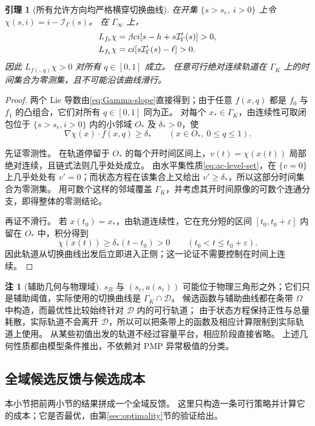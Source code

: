 \documentclass[11pt,a4paper,UTF8]{ctexart}
\newtheorem{lemma}[theorem]{引理}
\theoremstyle{definition}
\newtheorem{remark}[theorem]{注}
\newcommand{\Dcal}{\mathcal D}
\begin{document}
\begin{lemma}[所有允许方向均严格横穿切换曲线]
\label{lem:strict-crossing}
在开集 $\{s>s_e,\ i>0\}$ 上令 $\chi(s,i)=i-\mathcal I_\Gamma(s)$。
在 $\Gamma_\infty$ 上，
\begin{align}
L_{f_0}\chi&=\beta ci[s-h+s\mathcal I_\Gamma'(s)]>0,\notag\\
L_{f_1}\chi&=ci[s\mathcal I_\Gamma'(s)-\ell]>0.\label{eq:strict-crossing}
\end{align}
因此 $L_{f(\cdot,q)}\chi>0$ 对所有 $q\in[0,1]$ 成立。
任意可行绝对连续轨道在 $\Gamma_K$ 上的时间集合为零测集，且不可能沿该曲线滑行。
\end{lemma}
\begin{proof}
两个 Lie 导数由\eqref{eq:Gamma-slope}直接得到；由于任意 $f(x,q)$ 都是 $f_0$ 与 $f_1$ 的凸组合，它们对所有 $q\in[0,1]$ 同为正。
对每个 $x_*\in\Gamma_K$，由连续性可取闭包位于 $\{s>s_e,i>0\}$ 内的小邻域 $O_*$ 及 $\delta_*>0$，使
\[
\nabla\chi(x)\cdot f(x,q)\ge\delta_*\qquad(x\in O_*,\ 0\le q\le1).
\]

先证零测性。
在轨道停留于 $O_*$ 的每个开时间区间上，$v(t)=\chi(x(t))$ 局部绝对连续，且链式法则几乎处处成立。
由水平集性质\eqref{eq:ac-level-set}，在 $\{v=0\}$ 上几乎处处有 $v'=0$；而状态方程在该集合上又给出 $v'\ge\delta_*$，所以这部分时间集合为零测集。
用可数个这样的邻域覆盖 $\Gamma_K$，并考虑其开时间原像的可数个连通分支，即得整体的零测结论。

再证不滑行。
若 $x(t_0)=x_*$，由轨道连续性，它在充分短的区间 $[t_0,t_0+\varepsilon]$ 内留在 $O_*$ 中，积分得到
\begin{equation}
\chi(x(t))\ge\delta_*(t-t_0)>0\qquad(t_0<t\le t_0+\varepsilon).
\label{eq:strict-crossing-time}
\end{equation}
因此轨道从切换曲线出发后立即进入正侧；这一论证不需要控制在时间上连续。
\end{proof}

\begin{remark}[辅助几何与物理域]
$s_B$ 与 $(s_e,a(s_e))$ 可能位于物理三角形之外；它们只是辅助阈值，实际使用的切换曲线是 $\Gamma_K\cap\Dcal$。
候选函数与辅助曲线都在条带 $\Omega$ 中构造，而最优性比较始终针对 $\Dcal$ 内的可行轨道；
由于状态方程保持正性与总量耗散，实际轨道不会离开 $\Dcal$，所以可以把条带上的函数及相应计算限制到实际轨道上使用。
从某些初值出发的轨道不经过容量平台，相应阶段直接省略。
上述几何性质都由模型条件推出，不依赖对 PMP 异常极值的分类。
\end{remark}

\subsection{全域候选反馈与候选成本}
\label{sec:synthesis}
本小节把前两小节的结果拼成一个全域反馈。
这里只构造一条可行策略并计算它的成本；它是否最优，由第\ref{sec:optimality}节的验证给出。
\end{document}
